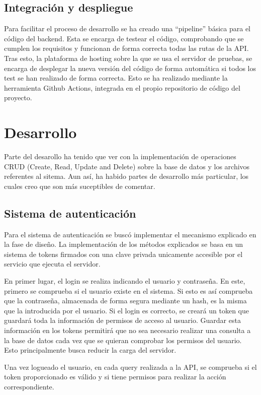 \subsection{Integración y despliegue}

Para facilitar el proceso de desarrollo se ha creado una ``pipeline'' básica para el código del backend. Esta se encarga de testear el código, comprobando que se cumplen los requisitos y funcionan de forma correcta todas las rutas de la API. Tras esto, la plataforma de hosting sobre la que se usa el servidor de pruebas, se encarga de desplegar la nueva versión del código de forma automática si todos los test se han realizado de forma correcta. Esto se ha realizado mediante la herramienta Github Actions, integrada en el propio repositorio de código del proyecto.

\section{Desarrollo}

Parte del desarollo ha tenido que ver con la implementación de operaciones CRUD (Create, Read, Update and Delete) sobre la base de datos y los archivos referentes al sitema. Aun así, ha habido partes de desarrollo más particular, los cuales creo que son más suceptibles de comentar.

\subsection{Sistema de autenticación}

Para el sistema de autenticación se buscó implementar el mecanismo explicado en la fase de diseño. La implementación de los métodos explicados se basa en un sistema de tokens firmados con una clave privada unicamente accesible por el servicio que ejecuta el servidor.

En primer lugar, el login se realiza indicando el usuario y contraseña. En este, primero se comprueba si el usuario existe en el sistema. Si esto es así comprueba que la contraseña, almacenada de forma segura mediante un hash, es la misma que la introducida por el usuario. Si el login es correcto, se creará un token que guardará toda la información de permisos de acceso al usuario. Guardar esta información en los tokens permitirá que no sea necesario realizar una consulta a la base de datos cada vez que se quieran comprobar los permisos del usuario. Esto principalmente busca reducir la carga del servidor.

Una vez logueado el usuario, en cada query realizada a la API, se comprueba si el token proporcionado es válido y si tiene permisos para realizar la acción correspondiente. 

